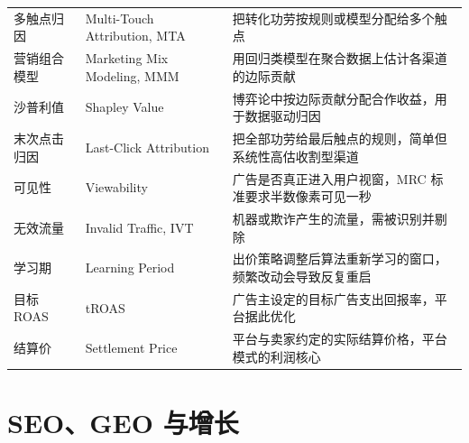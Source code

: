 \begin{xltabular}{\textwidth}{L{3.0cm} L{3.6cm} Y}
多触点归因 & Multi-Touch Attribution, MTA & 把转化功劳按规则或模型分配给多个触点 \\
营销组合模型 & Marketing Mix Modeling, MMM & 用回归类模型在聚合数据上估计各渠道的边际贡献 \\
沙普利值 & Shapley Value & 博弈论中按边际贡献分配合作收益，用于数据驱动归因 \\
末次点击归因 & Last-Click Attribution & 把全部功劳给最后触点的规则，简单但系统性高估收割型渠道 \\
可见性 & Viewability & 广告是否真正进入用户视窗，MRC 标准要求半数像素可见一秒 \\
无效流量 & Invalid Traffic, IVT & 机器或欺诈产生的流量，需被识别并剔除 \\
学习期 & Learning Period & 出价策略调整后算法重新学习的窗口，频繁改动会导致反复重启 \\
目标 ROAS & tROAS & 广告主设定的目标广告支出回报率，平台据此优化 \\
结算价 & Settlement Price & 平台与卖家约定的实际结算价格，平台模式的利润核心 \\
\end{xltabular}

\section{SEO、GEO 与增长}

